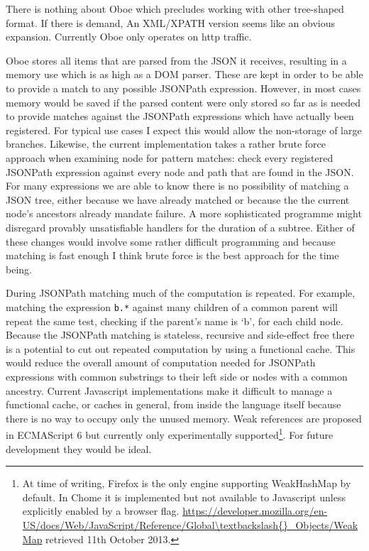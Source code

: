 \documentclass[]{article}
\begin{document}
There is nothing about Oboe which precludes working with other
tree-shaped format. If there is demand, An XML/XPATH version seems like
an obvious expansion. Currently Oboe only operates on http traffic.

Oboe stores all items that are parsed from the JSON it receives,
resulting in a memory use which is as high as a DOM parser. These are
kept in order to be able to provide a match to any possible JSONPath
expression. However, in most cases memory would be saved if the parsed
content were only stored so far as is needed to provide matches against
the JSONPath expressions which have actually been registered. For
typical use cases I expect this would allow the non-storage of large
branches. Likewise, the current implementation takes a rather brute
force approach when examining node for pattern matches: check every
registered JSONPath expression against every node and path that are
found in the JSON. For many expressions we are able to know there is no
possibility of matching a JSON tree, either because we have already
matched or because the the current node's ancestors already mandate
failure. A more sophisticated programme might disregard provably
unsatisfiable handlers for the duration of a subtree. Either of these
changes would involve some rather difficult programming and because
matching is fast enough I think brute force is the best approach for the
time being.

During JSONPath matching much of the computation is repeated. For
example, matching the expression \texttt{b.*} against many children of a
common parent will repeat the same test, checking if the parent's name
is `b', for each child node. Because the JSONPath matching is stateless,
recursive and side-effect free there is a potential to cut out repeated
computation by using a functional cache. This would reduce the overall
amount of computation needed for JSONPath expressions with common
substrings to their left side or nodes with a common ancestry. Current
Javascript implementations make it difficult to manage a functional
cache, or caches in general, from inside the language itself because
there is no way to occupy only the unused memory. Weak references are
proposed in ECMAScript 6 but currently only experimentally
supported\footnote{At time of writing, Firefox is the only engine
  supporting WeakHashMap by default. In Chome it is implemented but not
  available to Javascript unless explicitly enabled by a browser flag.
  \url{https://developer.mozilla.org/en-US/docs/Web/JavaScript/Reference/Global\textbackslash{}_Objects/WeakMap}
  retrieved 11th October 2013.}. For future development they would be
ideal.
\end{document}
